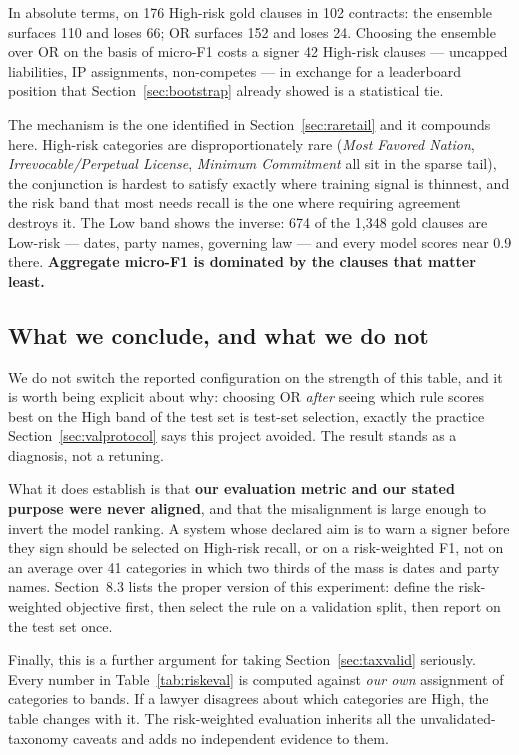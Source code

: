 In absolute terms, on 176 High-risk gold clauses in 102 contracts: the ensemble surfaces 110 and loses 66; OR surfaces 152 and loses 24. Choosing the ensemble over OR on the basis of micro-F1 costs a signer 42 High-risk clauses --- uncapped liabilities, IP assignments, non-competes --- in exchange for a leaderboard position that Section~\ref{sec:bootstrap} already showed is a statistical tie.

The mechanism is the one identified in Section~\ref{sec:raretail} and it compounds here. High-risk categories are disproportionately rare (\emph{Most Favored Nation}, \emph{Irrevocable/Perpetual License}, \emph{Minimum Commitment} all sit in the sparse tail), the conjunction is hardest to satisfy exactly where training signal is thinnest, and the risk band that most needs recall is the one where requiring agreement destroys it. The Low band shows the inverse: 674 of the 1{,}348 gold clauses are Low-risk --- dates, party names, governing law --- and every model scores near 0.9 there. \textbf{Aggregate micro-F1 is dominated by the clauses that matter least.}

\subsection{What we conclude, and what we do not}
We do not switch the reported configuration on the strength of this table, and it is worth being explicit about why: choosing OR \emph{after} seeing which rule scores best on the High band of the test set is test-set selection, exactly the practice Section~\ref{sec:valprotocol} says this project avoided. The result stands as a diagnosis, not a retuning.

What it does establish is that \textbf{our evaluation metric and our stated purpose were never aligned}, and that the misalignment is large enough to invert the model ranking. A system whose declared aim is to warn a signer before they sign should be selected on High-risk recall, or on a risk-weighted F1, not on an average over 41 categories in which two thirds of the mass is dates and party names. Section~8.3 lists the proper version of this experiment: define the risk-weighted objective first, then select the rule on a validation split, then report on the test set once.

Finally, this is a further argument for taking Section~\ref{sec:taxvalid} seriously. Every number in Table~\ref{tab:riskeval} is computed against \emph{our own} assignment of categories to bands. If a lawyer disagrees about which categories are High, the table changes with it. The risk-weighted evaluation inherits all the unvalidated-taxonomy caveats and adds no independent evidence to them.

